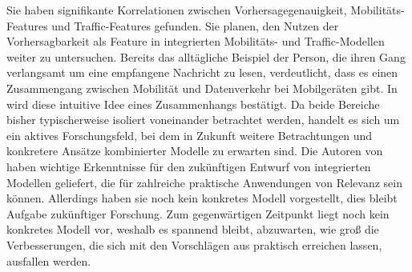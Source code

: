 \documentclass[12pt, a4paper]{article}
\begin{document}
Sie haben signifikante Korrelationen zwischen Vorhersagegenauigkeit, Mobilitäts-Features
und Traffic-Features gefunden. Sie planen, den Nutzen der Vorhersagbarkeit als Feature 
in integrierten Mobilitäts- und Traffic-Modellen weiter zu untersuchen.
\newline\newline
Bereits das alltägliche Beispiel der Person, die ihren Gang verlangsamt um eine empfangene Nachricht zu lesen,
verdeutlicht, dass es einen Zusammengang zwischen Mobilität und Datenverkehr bei Mobilgeräten gibt.
In \cite{Alipour2018} wird diese intuitive Idee eines Zusammenhangs bestätigt. Da beide Bereiche
bisher typischerweise isoliert voneinander betrachtet werden, handelt es sich um ein aktives Forschungsfeld,
bei dem in Zukunft weitere Betrachtungen und konkretere Ansätze kombinierter Modelle zu erwarten sind.
\newline\newline
Die Autoren von \cite{Alipour2018} haben wichtige Erkenntnisse für den zukünftigen Entwurf von integrierten Modellen
geliefert, die für zahlreiche praktische Anwendungen von Relevanz sein können. Allerdings haben sie noch kein konkretes
Modell vorgestellt, dies bleibt Aufgabe zukünftiger Forschung. Zum gegenwärtigen Zeitpunkt liegt noch kein konkretes Modell
vor, weshalb es spannend bleibt, abzuwarten, wie groß die Verbesserungen, die sich mit den Vorschlägen aus \cite{Alipour2018}
praktisch erreichen lassen, ausfallen werden.

\vfill
\pagebreak


%

\end{document}
